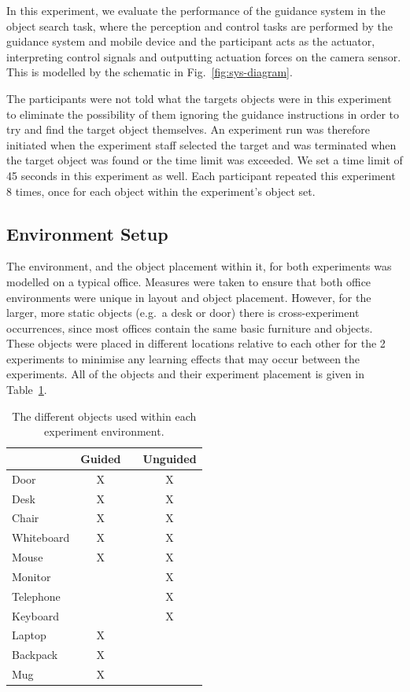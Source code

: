 \documentclass[runningheads]{llncs}
\begin{document}
In this experiment, we evaluate the performance of the guidance system in the object search task, where the perception and control tasks are performed by the guidance system and mobile device and the participant acts as the actuator, interpreting control signals and outputting actuation forces on the camera sensor. 
This is modelled by the schematic in Fig.~\ref{fig:sys-diagram}. 

The participants were not told what the targets objects were in this experiment to eliminate the possibility of them ignoring the guidance instructions in order to try and find the target object themselves.
An experiment run was therefore initiated when the experiment staff selected the target and was terminated when the target object was found or the time limit was exceeded.
We set a time limit of 45 seconds in this experiment as well.
Each participant repeated this experiment 8 times, once for each object within the experiment's object set. 

\subsection{Environment Setup}

The environment, and the object placement within it, for both experiments was modelled on a typical office.
Measures were taken to ensure that both office environments were unique in layout and object placement. 
However, for the larger, more static objects (e.g.\ a desk or door) there is cross-experiment occurrences, since most offices contain the same basic furniture and objects. 
These objects were placed in different locations relative to each other for the 2 experiments to minimise any learning effects that may occur between the experiments. 
All of the objects and their experiment placement is given in Table~\ref{tab:objects}.

\begin{table}
  \centering
  \caption{The different objects used within each experiment environment.}\label{tab:objects}
  \begin{tabular}{p{2cm}cp{0.7cm}c}
    \toprule
    & \bf{Guided} & & \bf{Unguided} \\\midrule
    Door        & X & & X \\\midrule
    Desk	& X & & X \\\midrule
    Chair	& X & & X \\\midrule
    Whiteboard	& X & & X \\\midrule
    Mouse	& X & & X \\\midrule
    Monitor	&   & & X \\\midrule
    Telephone	&   & & X \\\midrule
    Keyboard	&   & & X \\\midrule
    Laptop	& X & &   \\\midrule
    Backpack	& X & &   \\\midrule
    Mug		& X & &   \\\midrule
    \bottomrule
  \end{tabular}
\end{table}
\end{document}
